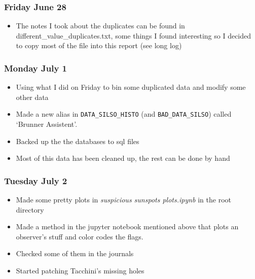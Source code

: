 \documentclass[12pt]{article}
\begin{document}
\subsubsection{Friday June 28} 
\begin{itemize}
    \item The notes I took about the duplicates can be found in different\_value\_duplicates.txt, some things I found interesting so I decided to copy most of the file into this report (see long log)
\end{itemize}
    
\subsubsection{Monday July 1}
\begin{itemize}
    \item Using what I did on Friday to bin some duplicated data and modify some other data
    \item Made a new alias in \texttt{DATA\_SILSO\_HISTO} (and \texttt{BAD\_DATA\_SILSO}) called `Brunner Assistent'.
    \item Backed up the the databases to sql files
    \item Most of this data has been cleaned up, the rest can be done by hand
\end{itemize}
    
\subsubsection{Tuesday July 2}
\begin{itemize}
    \item Made some pretty plots in \textit{suspicious sunspots plots.ipynb} in the root directory
    \item Made a method in the jupyter notebook mentioned above that plots an observer's stuff and color codes the flags.
    \item Checked some of them in the journals
    \item Started patching Tacchini's missing holes
\end{itemize}
    
\end{document}
